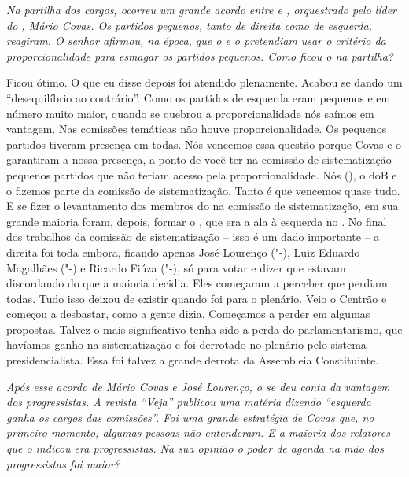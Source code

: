 \medskip

\emph{Na partilha dos cargos, ocorreu um grande acordo entre  e
, orquestrado pelo líder do , Mário Covas. Os partidos pequenos,
tanto de direita como de esquerda, reagiram. O senhor afirmou, na época,
que o  e o  pretendiam usar o critério da proporcionalidade para
esmagar os partidos pequenos. Como ficou o  na partilha?}

Ficou ótimo. O que eu disse depois foi atendido
plenamente. Acabou se dando um ``desequilíbrio ao contrário''. Como os
partidos de esquerda eram pequenos e em número muito maior, quando se
quebrou a proporcionalidade nós saímos em vantagem. Nas comissões
temáticas não houve proporcionalidade. Os pequenos partidos tiveram
presença em todas. Nós vencemos essa questão porque Covas e o 
garantiram a nossa presença, a ponto de você ter na comissão de
sistematização pequenos partidos que não teriam acesso pela
proporcionalidade. Nós (), o doB e o  fizemos parte da comissão
de sistematização. Tanto é que vencemos quase tudo. E se fizer o
levantamento dos membros do  na comissão de sistematização, em sua
grande maioria foram, depois, formar o , que era a ala à esquerda no
. No final dos trabalhos da comissão de sistematização -- isso é um
dado importante -- a direita foi toda embora, ficando apenas José
Lourenço ("-), Luiz Eduardo Magalhães ("-) e Ricardo Fiúza
("-), só para votar e dizer que estavam discordando do que a maioria
decidia. Eles começaram a perceber que perdiam todas. Tudo isso deixou
de existir quando foi para o plenário. Veio o Centrão e começou a
desbastar, como a gente dizia. Começamos a perder em algumas propostas.
Talvez o mais significativo tenha sido a perda do parlamentarismo, que
havíamos ganho na sistematização e foi derrotado no plenário pelo
sistema presidencialista. Essa foi talvez a grande derrota da Assembleia
Constituinte.

\medskip

\emph{Após esse acordo de Mário Covas e José Lourenço, o  se deu
conta da vantagem dos progressistas. A revista ``Veja'' publicou uma
matéria dizendo ``esquerda ganha os cargos das comissões''. Foi uma
grande estratégia de Covas que, no primeiro momento, algumas pessoas não
entenderam. E a maioria dos relatores que o  indicou era
progressistas. Na sua opinião o poder de agenda na mão dos progressistas
foi maior?}

